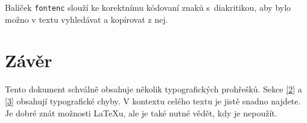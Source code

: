 \documentclass[twocolumn,a4paper]{article}
\begin{document}
Balíček \verb|fontenc| slouží ke korektnímu kódovaní znaků s~diakritikou, aby bylo možno v textu vyhledávat a kopírovat z nej.

\section{Závěr}

Tento dokument schválně obsahuje několik typografických prohřešků. Sekce \ref{2} a \ref{3} obsahují typografické chyby. V kontextu celého textu je jistě snadno najdete. Je dobré znát možnosti {\LaTeX}u, ale je také nutné vědět, kdy je nepoužít.
\end{document}
